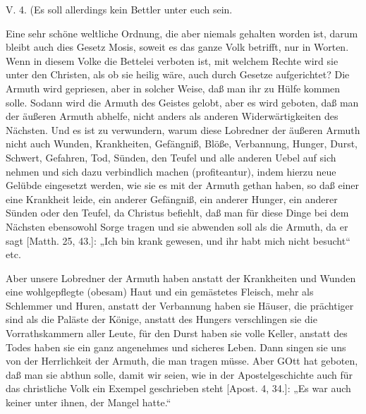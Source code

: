 \begin{schriftzitat}
V. 4. (Es soll allerdings kein Bettler unter euch sein.
\end{schriftzitat}

Eine sehr schöne weltliche Ordnung, die aber niemals gehalten worden ist, darum bleibt auch dies Gesetz Mosis, soweit es das ganze Volk betrifft, nur in Worten. Wenn in diesem Volke die Bettelei verboten ist, mit welchem Rechte wird sie unter den Christen, als ob sie heilig wäre, auch durch Gesetze aufgerichtet? Die Armuth wird gepriesen, aber in solcher Weise, daß man ihr zu Hülfe kommen solle. Sodann wird die Armuth des Geistes gelobt, aber es wird geboten, daß man der äußeren Armuth abhelfe, nicht anders als anderen Widerwärtigkeiten des Nächsten. Und es ist zu verwundern, warum diese Lobredner der äußeren Armuth nicht auch Wunden, Krankheiten, Gefängniß, Blöße, Verbannung, Hunger, Durst, Schwert, Gefahren, Tod, Sünden, den Teufel und alle anderen Uebel auf sich nehmen und sich dazu verbindlich machen (profiteantur), indem hierzu neue Gelübde eingesetzt werden, wie sie es mit der Armuth gethan haben, so daß einer eine Krankheit leide, ein anderer Gefängniß, ein anderer Hunger, ein anderer Sünden oder den Teufel, da Christus befiehlt, daß man für diese Dinge bei dem Nächsten ebensowohl Sorge tragen und sie abwenden soll als die Armuth, da er sagt [Matth. 25, 43.]: „Ich bin krank gewesen, und ihr habt mich nicht besucht“ etc.

Aber unsere Lobredner der Armuth haben anstatt der Krankheiten und Wunden eine wohlgepflegte (obesam) Haut und ein gemästetes Fleisch, mehr als Schlemmer und Huren, anstatt der Verbannung haben sie Häuser, die prächtiger sind als die Paläste der Könige, anstatt des Hungers verschlingen sie die Vorrathskammern aller Leute, für den Durst haben sie volle Keller, anstatt des Todes haben sie ein ganz angenehmes und sicheres Leben. Dann singen sie uns von der Herrlichkeit der Armuth, die man tragen müsse. Aber GOtt hat geboten, daß man sie abthun solle, damit wir seien, wie in der Apostelgeschichte auch für das christliche Volk ein Exempel geschrieben steht [Apost. 4, 34.]: „Es war auch keiner unter ihnen, der Mangel hatte.“

